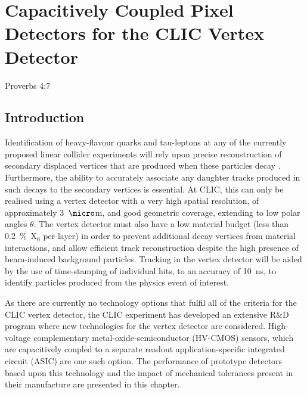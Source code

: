 \chapter{Capacitively Coupled Pixel Detectors for the CLIC Vertex Detector}
\label{chap:clicvertex}

{Proverbs 4:7}


\section{Introduction}
Identification of heavy-flavour quarks and tau-leptons at any of the currently proposed linear collider experiments will rely upon precise reconstruction of secondary displaced vertices that are produced when these particles decay \cite{Linssen:2012hp}.  Furthermore, the ability to accurately associate any daughter tracks produced in such decays to the secondary vertices is essential.  At CLIC, this can only be realised using a vertex detector with a very high spatial resolution, of approximately 3~${\micro}$m, and good geometric coverage, extending to low polar angles $\theta$.  The vertex detector must also have a low material budget (less than 0.2~\%~$\text{X}_{0}$ per layer) in order to prevent additional decay vertices from material interactions, and allow efficient track reconstruction despite the high presence of beam-induced background particles.  Tracking in the vertex detector will be aided by the use of time-stamping of individual hits, to an accuracy of 10~ns, to identify particles produced from the physics event of interest.  

As there are currently no technology options that fulfil all of the criteria for the CLIC vertex detector, the CLIC experiment has developed an extensive R\&D program where new technologies for the vertex detector are considered.  High-voltage complementary metal-oxide-semiconductor (HV-CMOS) sensors, which are capacitively coupled to a separate readout application-specific integrated circuit (ASIC) are one such option. The performance of prototype detectors based upon this technology and the impact of mechanical tolerances present in their manufacture are presented in this chapter.  

